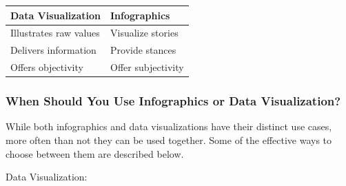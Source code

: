 \documentclass[]{book}
\begin{document}
\begin{longtable}[]{@{}ll@{}}
\toprule
Data Visualization & Infographics\tabularnewline
\midrule
\endhead
Illustrates raw values & Visualize stories\tabularnewline
Delivers information & Provide stances\tabularnewline
Offers objectivity & Offer subjectivity\tabularnewline
\bottomrule
\end{longtable}

\subsubsection{When Should You Use Infographics or Data
Visualization?}\label{when-should-you-use-infographics-or-data-visualization}

While both infographics and data visualizations have their distinct use
cases, more often than not they can be used together. Some of the
effective ways to choose between them are described below.

Data Visualization:
\end{document}
